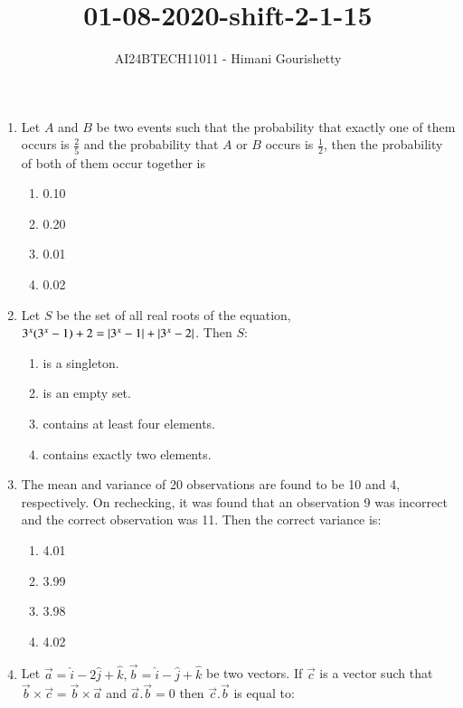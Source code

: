 \documentclass[journal,12pt,onecolumn]{IEEEtran}
\theoremstyle{remark}
\begin{document}

\vspace{3cm}

\title{01-08-2020-shift-2-1-15}
\author{AI24BTECH11011 - Himani Gourishetty}
\maketitle
\bigskip

\renewcommand{\thefigure}{\theenumi}
\renewcommand{\thetable}{\theenumi}
\begin{enumerate}
    \item Let $A$ and $B$ be two events such that the probability that exactly one of them occurs is $\frac{2}{5}$ and the probability that $A$ or $B$ occurs is $\frac{1}{2}$, then the probability of both of them occur together is
    \begin{enumerate}
	\item 0.10
        \item 0.20
        \item 0.01
        \item 0.02
    \end{enumerate}
    \item  Let $S$ be the set of all real roots of the equation, $3^x(3^x-1) + 2 = \left\vert3^x-1\right\vert + \left\vert3^x-2\right\vert$. Then $S$:
    \begin{enumerate}
        \item is a singleton.
        \item is an empty set.
        \item contains at least four elements.
        \item contains exactly two elements.
    \end{enumerate}
    \item The mean and variance of 20 observations are found to be 10 and 4, respectively. On rechecking, it was found that an observation 9 was incorrect and the correct observation was 11. Then the correct variance is:
    \begin{enumerate}
        \item 4.01
        \item 3.99
        \item 3.98
        \item 4.02
    \end{enumerate}
    \item Let $\vec{a}=\hat{i}-2\hat{j}+\hat{k},\vec{b}=\hat{i}-\hat{j}+\hat{k}$ be two vectors. If $\vec{c}$ is a vector such that $\vec{b}\times\vec{c} = \vec{b} \times \vec{a}$ and $\vec{a}.\vec{b}=0$ then $\vec{c}.\vec{b}$ is equal to:

\end{enumerate}
\end{document}
